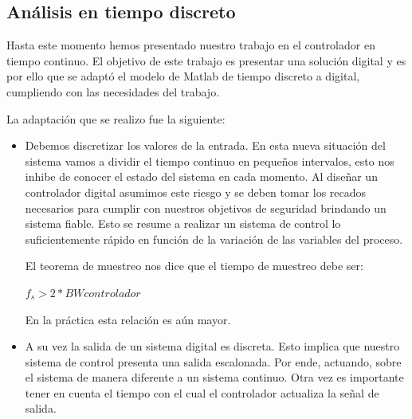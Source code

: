 \documentclass[journal]{IEEEtran}
\begin{document}
\subsection{Análisis en tiempo discreto}
Hasta este momento hemos presentado nuestro trabajo en el controlador en tiempo continuo.
El objetivo de este trabajo es presentar una solución digital y es por ello que se adaptó
el modelo de Matlab de tiempo discreto a digital, cumpliendo con las necesidades del
trabajo. 

La adaptación que se realizo fue la siguiente:
\begin{itemize}
 \item Debemos discretizar los valores de la entrada. En esta nueva situación del sistema 
vamos a dividir el tiempo continuo en pequeños intervalos, esto nos inhibe de conocer
el estado del sistema en cada momento. Al diseñar un controlador digital asumimos este
riesgo y se deben tomar los recados necesarios para cumplir con nuestros objetivos de 
seguridad brindando un sistema fiable. Esto se resume a realizar un sistema de control 
lo suficientemente rápido en función de la variación de las variables del proceso.

El teorema de muestreo nos dice que el tiempo de muestreo debe ser:

$ f_s > 2*BWcontrolador $

En la práctica esta relación es aún mayor.

\item A su vez la salida de un sistema digital es discreta. Esto implica 
que nuestro sistema de control presenta una salida escalonada. Por ende, 
actuando, sobre el sistema de manera diferente a un sistema continuo. Otra 
vez es importante tener en cuenta el tiempo con el cual el controlador actualiza
la señal de salida.
\end{itemize}
\end{document}
